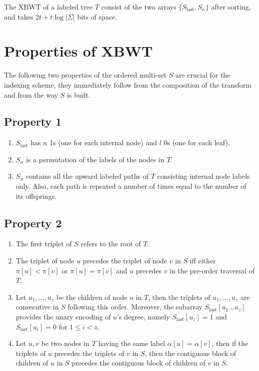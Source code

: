 \begin{teorema}
    The XBWT of a labeled tree $T$ consist of the two arrays $\{S_{\text{last}}, S_{\alpha}\}$ after sorting, and takes $2t + t \log |\Sigma|$ bits of space. 
\end{teorema}

\section{Properties of XBWT}
The following two properties of the ordered multi-set $S$ are crucial for the indexing scheme, they immediately follow from the composition of the transform and from the way $S$ is built.

\subsection{Property 1} \label{prop1}
\begin{enumerate}
    \item $S_{\text{last}}$ has $n$ 1s (one for each internal node) and $l$ 0s (one for each leaf).
    \item $S_{\alpha}$ is a permutation of the labels of the nodes in $T$.
    \item $S_{\pi}$ contains all the upward labeled paths of $T$ consisting internal node labels only. Also, each path is repeated a number of times equal to the number of its offsprings.
\end{enumerate}

\subsection{Property 2} \label{prop2}
\begin{enumerate}
    \item The first triplet of $S$ refers to the root of $T$.
    \item The triplet of node $u$ precedes the triplet of node $v$ in $S$ iff either $\pi[u] < \pi[v]$ or $\pi[u] = \pi[v]$ and $u$ precedes $v$ in the pre-order traversal of $T$.
    \item Let $u_1, \dots, u_z$ be the children of node $u$ in $T$, then the triplets of $u_1, \dots, u_z$ are consecutive in $S$ following this order. Moreover, the subarray $S_{\text{last}}[u_1 \dots u_z]$ provides the unary encoding of $u$'s degree, namely $S_{\text{last}}[u_z] = 1$ and $S_{\text{last}}[u_i] = 0$ for $1 \leq i < z$.
    \item Let $u, v$ be two nodes in $T$ having the same label $\alpha[u] = \alpha[v]$, then if the triplets of $u$ precedes the triplets of $v$ in $S$, then the contiguous block of children of $u$ in $S$ precedes the contiguous block of children of $v$ in $S$. 
\end{enumerate}

